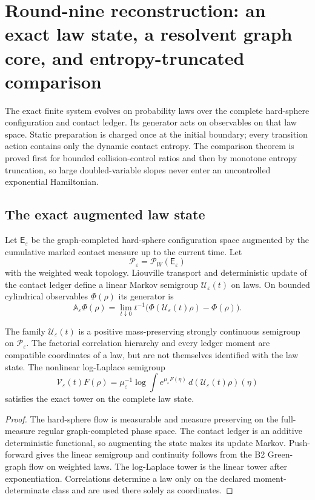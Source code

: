 \section{Round-nine reconstruction: an exact law state, a resolvent graph core, and entropy-truncated comparison}
\label{sec:r9-b4}

The exact finite system evolves on probability laws over the complete
hard-sphere configuration and contact ledger.  Its generator acts on
observables on that law space.  Static preparation is charged once at the
initial boundary; every transition action contains only the dynamic contact
entropy.  The comparison theorem is proved first for bounded collision-control
ratios and then by monotone entropy truncation, so large doubled-variable
slopes never enter an uncontrolled exponential Hamiltonian.

\subsection{The exact augmented law state}

Let $\mathsf E_\varepsilon$ be the graph-completed hard-sphere configuration
space augmented by the cumulative marked contact measure up to the current
time.  Let
\[
 \mathscr P_\varepsilon=\mathcal P_{W}(\mathsf E_\varepsilon)
\]
with the weighted weak topology.  Liouville transport and deterministic update
of the contact ledger define a linear Markov semigroup
$\mathscr U_\varepsilon(t)$ on laws.  On bounded cylindrical observables
$\Phi(\rho)$ its generator is
\[
 \mathbb A_\varepsilon\Phi(\rho)
 =\lim_{t\downarrow0}
  t^{-1}\bigl(\Phi(\mathscr U_\varepsilon(t)\rho)-\Phi(\rho)\bigr).
\]

\begin{theorem}
\label{thm:r9-b4-law}
The family $\mathscr U_\varepsilon(t)$ is a positive mass-preserving strongly
continuous semigroup on $\mathscr P_\varepsilon$.  The factorial correlation
hierarchy and every ledger moment are compatible coordinates of a law, but are
not themselves identified with the law state.  The nonlinear log-Laplace
semigroup
\[
 \mathscr V_\varepsilon(t)F(\rho)
 =\mu_\varepsilon^{-1}
  \log\int e^{\mu_\varepsilon F(\eta)}
  \,d(\mathscr U_\varepsilon(t)\rho)(\eta)
\]
satisfies the exact tower on the complete law state.
\end{theorem}

\begin{proof}
The hard-sphere flow is measurable and measure preserving on the
full-measure regular graph-completed phase space.  The contact ledger is an
additive deterministic functional, so augmenting the state makes its update
Markov.  Push-forward gives the linear semigroup and continuity follows from
the B2 Green-graph flow on weighted laws.  The log-Laplace tower is the linear
tower after exponentiation.  Correlations determine a law only on the declared
moment-determinate class and are used there solely as coordinates.
\end{proof}

